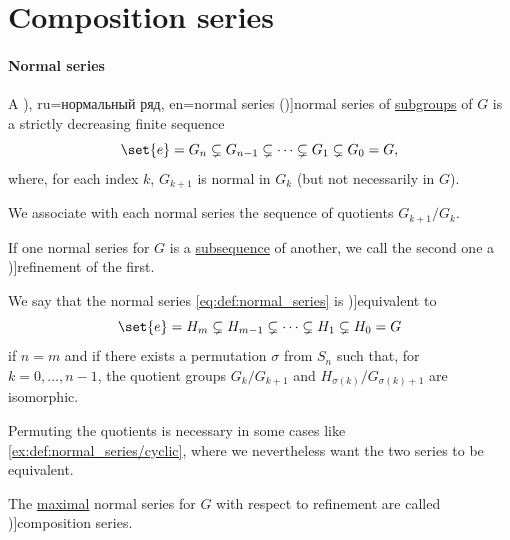 \section{Composition series}\label{sec:composition_series}

\paragraph{Normal series}

\begin{definition}\label{def:normal_series}
  A \term[bg=нормален ред (\cite[def. XII.6]{ГеновМиховскиМоллов1991Алгебра}), ru=нормальный ряд, en=normal series (\cite[207]{Aluffi2009Algebra})]{normal series} of \hyperref[def:group/subobject]{subgroups} of \( G \) is a strictly decreasing finite sequence
  \begin{equation}\label{eq:def:normal_series}
    \set{ e } = G_n \subsetneq G_{n-1} \subsetneq \cdots \subsetneq G_1 \subsetneq G_0 = G,
  \end{equation}
  where, for each index \( k \), \( G_{k+1} \) is normal in \( G_k \) (but not necessarily in \( G \)).

  We associate with each normal series the sequence of quotients \( G_{k+1} / G_k \).

  \begin{thmenum}
     If one normal series for \( G \) is a \hyperref[def:subsequence]{subsequence} of another, we call the second one a \term[ru=уплотнение, en=refinement (\cite[197]{Rotman2015AdvancedModernAlgebraPart1})]{refinement} of the first.

     We say that the normal series \eqref{eq:def:normal_series} is \term[ru=изоморфные (ряды), en=equivalent (series) (\cite[197]{Rotman2015AdvancedModernAlgebraPart1})]{equivalent} to
    \begin{equation*}
      \set{ e } = H_m \subsetneq H_{m-1} \subsetneq \cdots \subsetneq H_1 \subsetneq H_0 = G
    \end{equation*}
    if \( n = m \) and if there exists a permutation \( \sigma \) from \( S_n \) such that, for \( k = 0, \ldots, n - 1 \), the quotient groups \( G_k / G_{k+1} \) and \( H_{\sigma(k)} / G_{\sigma(k)+1} \) are isomorphic.

    Permuting the quotients is necessary in some cases like \cref{ex:def:normal_series/cyclic}, where we nevertheless want the two series to be equivalent.

     The \hyperref[def:extremal_points/maximal_and_minimal_element]{maximal} normal series for \( G \) with respect to refinement are called \term[ru=композиционный ряд, en=composition series (\cite[302]{Rotman2015AdvancedModernAlgebraPart1})]{composition series}.
  \end{thmenum}
\end{definition}
